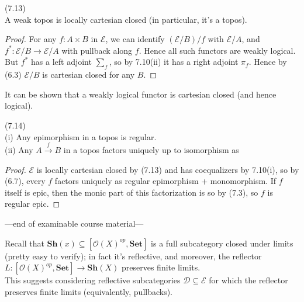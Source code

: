 \documentclass[a4paper]{article}
\begin{document}
\begin{coro} (7.13)\\
    A weak topos is locally cartesian closed (in particular, it's a topos).
    \begin{proof}
        For any $f:A \times B$ in $\mathcal{E}$, we can identify $(\mathcal{E}/B) / f$ with $\mathcal{E}/A$, and $f^*:\mathcal{E}/B \to \mathcal{E}/A$ with pullback along $f$. Hence all such functors are weakly logical.\\
        But $f^*$ has a left adjoint $\sum_f$, so by 7.10(ii) it has a right adjoint $\pi_f$. Hence by (6.3) $\mathcal{E}/B$ is cartesian closed for any $B$.
    \end{proof}
\end{coro}

\begin{rem}
    It can be shown that a weakly logical functor is cartesian closed (and hence logical).
\end{rem}

\begin{coro} (7.14)\\
    (i) Any epimorphism in a topos is regular.\\
    (ii) Any $A \xrightarrow{f} B$ in a topos factors uniquely up to isomorphism as
    \begin{proof}
        $\mathcal{E}$ is locally cartesian closed by (7.13) and has coequalizers by 7.10(i), so by (6.7), every $f$ factors uniquely as regular epimorphism + monomorphism. If $f$ itself is epic, then the monic part of this factorization is so by (7.3), so $f$ is regular epic.
    \end{proof}
\end{coro}

---end of examinable course material---

Recall that $\mathbf{Sh}(x) \subseteq [\mathcal{O}(X)^{op},\mathbf{Set}]$ is a full subcategory closed under limits (pretty easy to verify); in fact it's reflective, and moreover, the reflector $L:[\mathcal{O}(X)^{op},\mathbf{Set}] \to \mathbf{Sh}(X)$ preserves finite limits.\\
This suggests considering reflective subcategories $\mathcal{D} \subseteq \mathcal{E}$ for which the reflector preserves finite limits (equivalently, pullbacks).
\end{document}
